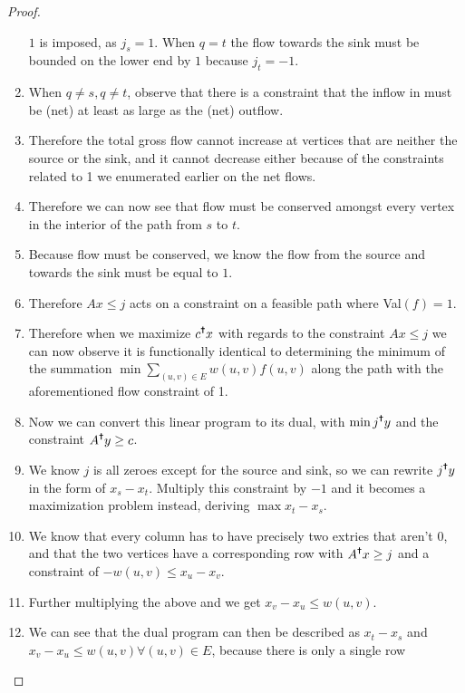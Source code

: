 \documentclass{article}
\begin{document}
\begin{proof}
\begin{enumerate}
      \(1\) is imposed, as \(j_s = 1\). When \(q = t\) the flow towards the sink must be
      bounded on the lower end by \(1\) because \(j_t = -1\).
      \item When \(q \neq s, q \neq t\), observe that there is a constraint that the
      inflow in must be (net) at least as large as the (net) outflow. 
      \item Therefore the total gross flow cannot increase at vertices that are neither the
      source or the sink, and it cannot decrease either because of the constraints related to 1
      we enumerated earlier on the net flows. 
      \item Therefore we can now see that flow must be conserved amongst every vertex in
      the interior of the path from \(s\) to \(t\).
      \item Because flow must be conserved, we know the flow from the source and towards
      the sink must be equal to \(1\). 
      \item Therefore \(A x \leq j\) acts on a constraint on a feasible path where
      Val\((f) = 1\). 
      \item Therefore when we maximize \(c^{\text{\Cross{}}}x\) with regards to the
      constraint \(A x \leq j\) we can now observe it is functionally identical to
      determining the minimum of the summation \(\min \sum_{(u,v)\in E} w(u,v) f(u,v)\)
      along the path with the aforementioned flow constraint of 1. 
      \item Now we can convert this linear program to its dual, with \( \min
      j^{\text{\Cross{}}}y\) and the constraint \(A^{\text{\Cross{}}} y \geq c\).
      \item We know \(j\) is all zeroes except for the source and sink, so we can rewrite
      \(j^{\text{\Cross{}}} y\) in the form of \(x_s - x_t\). Multiply this constraint by
      \(-1\) and it becomes a maximization problem instead, deriving \(\max{x_t - x_s}\).
      \item We know that every column has to have precisely two extries that aren't 0, and
      that the two vertices have a corresponding row with \(A^{\text{\Cross{}}}x \geq j\)
      and a constraint of \(-w(u,v) \leq x_u - x_v\). 
      \item Further multiplying the above and we get \(x_v - x_u \leq w(u,v)\).
      \item We can see that the dual program can then be described as \(x_t - x_s\) and
      \(x_v - x_u \leq w(u,v) \forall (u,v) \in E\), because there is only a single row

\end{enumerate}
\end{proof}
\end{document}
